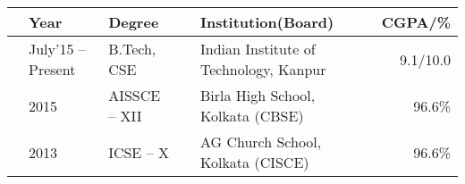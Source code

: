
\newcommand{\education}[4]{
  & #1 & #2 & &#3 & #4
}
\begin{tabular}{ | L{0.05cm} l | L{3cm} | L{0.05cm} C{8cm} | r |}
  \hline
  \education{\textbf{Year}}{\textbf{Degree}}{\textbf{Institution(Board)}}{\textbf{CGPA/\%}}\\
  \hline
  \education{July'15 -- Present}{B.Tech, CSE}{Indian Institute of Technology, Kanpur}{9.1/10.0}\\
  \education{2015}{AISSCE -- XII}{Birla High School, Kolkata (CBSE)}{96.6\%}\\
  \education{2013}{ICSE -- X}{AG Church School, Kolkata (CISCE)}{96.6\%}\\
  \hline
\end{tabular}


